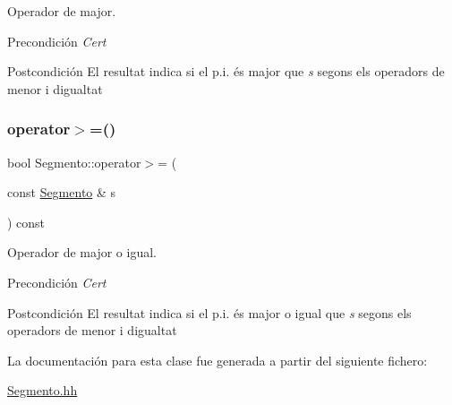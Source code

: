 Operador de major. 

\begin{DoxyPrecond}{Precondición}
{\itshape Cert} 
\end{DoxyPrecond}
\begin{DoxyPostcond}{Postcondición}
El resultat indica si el p.\+i. és major que {\itshape s} segons els operadors de menor i d\textquotesingle{}igualtat 
\end{DoxyPostcond}
\mbox{\label{class_segmento_a74e0ca47b9bf2316a0f55351529380f6}} 
\subsubsection{\texorpdfstring{operator$>$=()}{operator>=()}}
{\footnotesize\ttfamily bool Segmento\+::operator$>$= (\begin{DoxyParamCaption}\item[{const \hyperlink{class_segmento}{Segmento} \&}]{s }\end{DoxyParamCaption}) const}



Operador de major o igual. 

\begin{DoxyPrecond}{Precondición}
{\itshape Cert} 
\end{DoxyPrecond}
\begin{DoxyPostcond}{Postcondición}
El resultat indica si el p.\+i. és major o igual que {\itshape s} segons els operadors de menor i d\textquotesingle{}igualtat 
\end{DoxyPostcond}


La documentación para esta clase fue generada a partir del siguiente fichero\+:\begin{DoxyCompactItemize}
\item 
\hyperlink{_segmento_8hh}{Segmento.\+hh}\end{DoxyCompactItemize}
